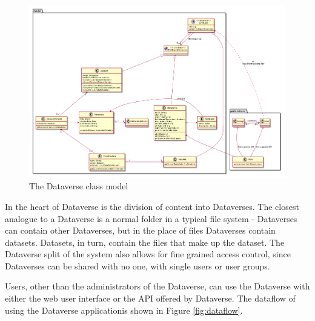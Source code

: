\begin{figure}
    \begin{centering}
        \includegraphics[width=\textwidth]{images/dataverse-model}
    \end{centering}
    \caption[The Dataverse class model]{The Dataverse class model}
    \label{fig:dataverse-model}
\end{figure}

In the heart of Dataverse is the division of content into Dataverses. The
closest analogue to a Dataverse is a normal folder in a typical file system -
Dataverses can contain other Dataverses, but in the place of files Dataverses
contain datasets. Datasets, in turn, contain the files that make up the
dataset. The Dataverse split of the system also allows for fine grained access
control, since Dataverses can be shared with no one, with single users or user
groups.

Users, other than the administrators of the Dataverse, can use the Dataverse
with either the web user interface or the API offered by Dataverse. The
dataflow of using the Dataverse application is shown in Figure
\ref{fig:dataflow}.

